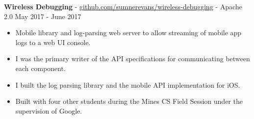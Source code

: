 \documentclass[10pt,letterpaper]{article}
\begin{document}
\textbf{Wireless Debugging} -
\href{https://github.com/sumnerevans/wireless-debugging}{github.com/sumnerevans/wireless-debugging}
- Apache 2.0 \hfill May 2017 - June 2017
\begin{itemize}
    \item Mobile library and log-parsing web server to allow streaming of mobile
        app logs to a web UI console.
    \item I was the primary writer of the API specifications for communicating
        between each component.
    \item I built the log parsing library and the mobile API implementation for
        iOS.
    \item Built with four other students during the Mines CS Field Session under
        the supervision of Google.
\end{itemize}


\end{document}
